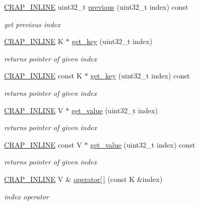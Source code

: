 \begin{DoxyCompactItemize}
\hyperlink{config__x86_8h_a5a40526b8d842e7ff731509998bb0f1c}{C\+R\+A\+P\+\_\+\+I\+N\+L\+I\+N\+E} uint32\+\_\+t \hyperlink{classcrap_1_1tree__map_a5abad3c74353a3ffd5809a5ad90a5043}{previous} (uint32\+\_\+t index) const 
\begin{DoxyCompactList}\small\item\em get previous index \end{DoxyCompactList}\item 
\hyperlink{config__x86_8h_a5a40526b8d842e7ff731509998bb0f1c}{C\+R\+A\+P\+\_\+\+I\+N\+L\+I\+N\+E} K $\ast$ \hyperlink{classcrap_1_1tree__map_a769dfe2def3e2f7afec379330a5dccd5}{get\+\_\+key} (uint32\+\_\+t index)
\begin{DoxyCompactList}\small\item\em returns pointer of given index \end{DoxyCompactList}\item 
\hyperlink{config__x86_8h_a5a40526b8d842e7ff731509998bb0f1c}{C\+R\+A\+P\+\_\+\+I\+N\+L\+I\+N\+E} const K $\ast$ \hyperlink{classcrap_1_1tree__map_adc132a76869010965935305174c18969}{get\+\_\+key} (uint32\+\_\+t index) const 
\begin{DoxyCompactList}\small\item\em returns pointer of given index \end{DoxyCompactList}\item 
\hyperlink{config__x86_8h_a5a40526b8d842e7ff731509998bb0f1c}{C\+R\+A\+P\+\_\+\+I\+N\+L\+I\+N\+E} V $\ast$ \hyperlink{classcrap_1_1tree__map_ae7e9ee14f25b0f6eff1c873ecee23a42}{get\+\_\+value} (uint32\+\_\+t index)
\begin{DoxyCompactList}\small\item\em returns pointer of given index \end{DoxyCompactList}\item 
\hyperlink{config__x86_8h_a5a40526b8d842e7ff731509998bb0f1c}{C\+R\+A\+P\+\_\+\+I\+N\+L\+I\+N\+E} const V $\ast$ \hyperlink{classcrap_1_1tree__map_a9d76484289e78739fe2f171af0a6b8af}{get\+\_\+value} (uint32\+\_\+t index) const 
\begin{DoxyCompactList}\small\item\em returns pointer of given index \end{DoxyCompactList}\item 
\hyperlink{config__x86_8h_a5a40526b8d842e7ff731509998bb0f1c}{C\+R\+A\+P\+\_\+\+I\+N\+L\+I\+N\+E} V \& \hyperlink{classcrap_1_1tree__map_a7f4c3ff977dafbe9c0ba7c7f02cfd065}{operator\mbox{[}$\,$\mbox{]}} (const K \&index)
\begin{DoxyCompactList}\small\item\em index operator \end{DoxyCompactList}\item 

\end{DoxyCompactItemize}
